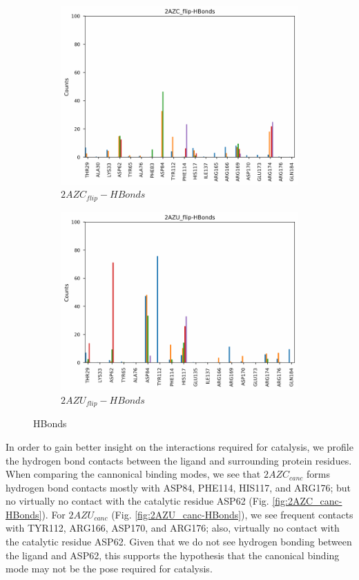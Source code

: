 \documentclass[fleqn,10pt]{wlscirep}
\begin{document}
\begin{figure}[!ht]
\begin{subfigure}{.45\textwidth}
     \includegraphics[width=.95\linewidth]{2AZC_flip/2AZC_flip-HBonds.pdf}
     \caption{$2AZC_{flip}-HBonds$}
     \label{fig:2AZC_flip-HBonds}
   \end{subfigure}
    \begin{subfigure}{.45\textwidth}
     \centering
     \includegraphics[width=.95\linewidth]{2AZU_flip/2AZU_flip-HBonds.pdf}
     \caption{$2AZU_{flip}-HBonds$}
     \label{fig:2AZU_flip-HBonds}
   \end{subfigure}
\caption{HBonds}
\label{fig:HBonds}
\end{figure}

In order to gain better insight on the interactions required for catalysis, we profile the hydrogen bond contacts between the ligand and surrounding protein residues.
When comparing the cannonical binding modes, we see that $2AZC_{canc}$ forms hydrogen bond contacts mostly with ASP84, PHE114, HIS117, and ARG176; but no virtually no contact with the catalytic residue ASP62 (Fig. \ref{fig:2AZC_canc-HBonds}).
For $2AZU_{canc}$ (Fig. \ref{fig:2AZU_canc-HBonds}), we see frequent contacts with TYR112, ARG166, ASP170, and ARG176; also, virtually no contact with the catalytic residue ASP62.
Given that we do not see hydrogen bonding between the ligand and ASP62, this supports the hypothesis that the canonical binding mode may not be the pose required for catalysis.
\end{document}
